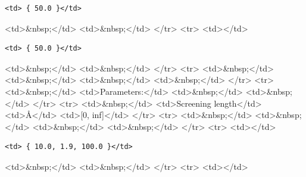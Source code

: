 \begin{verbatim}
<td> { 50.0 }</td>
\end{verbatim}

\textless{}td\textgreater{}\&nbsp;\textless{}/td\textgreater{} \textless{}td\textgreater{}\&nbsp;\textless{}/td\textgreater{} \textless{}/tr\textgreater{} \textless{}tr\textgreater{} \textless{}td\textgreater{}\textless{}/td\textgreater{}

\begin{verbatim}
<td> { 50.0 }</td>
\end{verbatim}

\textless{}td\textgreater{}\&nbsp;\textless{}/td\textgreater{} \textless{}td\textgreater{}\&nbsp;\textless{}/td\textgreater{} \textless{}/tr\textgreater{} \textless{}tr\textgreater{} \textless{}td\textgreater{}\&nbsp;\textless{}/td\textgreater{} \textless{}td\textgreater{}\&nbsp;\textless{}/td\textgreater{} \textless{}td\textgreater{}\&nbsp;\textless{}/td\textgreater{} \textless{}td\textgreater{}\&nbsp;\textless{}/td\textgreater{} \textless{}/tr\textgreater{} \textless{}tr\textgreater{} \textless{}td\textgreater{}\&nbsp;\textless{}/td\textgreater{} \textless{}td\textgreater{}Parameters:\textless{}/td\textgreater{} \textless{}td\textgreater{}\&nbsp;\textless{}/td\textgreater{} \textless{}td\textgreater{}\&nbsp;\textless{}/td\textgreater{} \textless{}/tr\textgreater{} \textless{}tr\textgreater{} \textless{}td\textgreater{}\&nbsp;\textless{}/td\textgreater{} \textless{}td\textgreater{}Screening length\textless{}/td\textgreater{} \textless{}td\textgreater{}\AA{}\textless{}/td\textgreater{} \textless{}td\textgreater{}[0, inf]\textless{}/td\textgreater{} \textless{}/tr\textgreater{} \textless{}tr\textgreater{} \textless{}td\textgreater{}\&nbsp;\textless{}/td\textgreater{} \textless{}td\textgreater{}\&nbsp;\textless{}/td\textgreater{} \textless{}td\textgreater{}\&nbsp;\textless{}/td\textgreater{} \textless{}td\textgreater{}\&nbsp;\textless{}/td\textgreater{} \textless{}/tr\textgreater{} \textless{}tr\textgreater{} \textless{}td\textgreater{}\textless{}/td\textgreater{}

\begin{verbatim}
<td> { 10.0, 1.9, 100.0 }</td>
\end{verbatim}

\textless{}td\textgreater{}\&nbsp;\textless{}/td\textgreater{} \textless{}td\textgreater{}\&nbsp;\textless{}/td\textgreater{} \textless{}/tr\textgreater{} \textless{}tr\textgreater{} \textless{}td\textgreater{}\textless{}/td\textgreater{}

